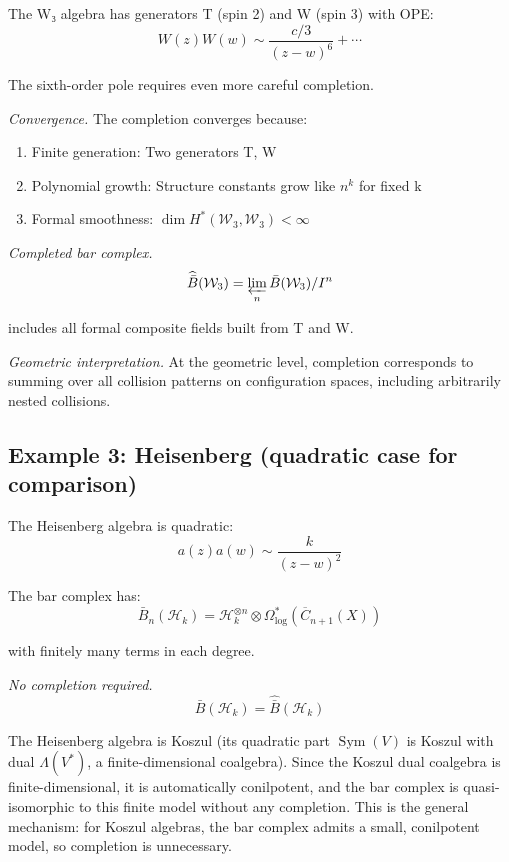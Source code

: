 \begin{example}\label{ex:w3-completion}
The W₃ algebra has generators T (spin 2) and W (spin 3) with OPE:
\[W(z)W(w) \sim \frac{c/3}{(z-w)^6} + \cdots\]

The sixth-order pole requires even more careful completion.

\emph{Convergence.}
The completion converges because:
\begin{enumerate}
\item Finite generation: Two generators T, W
\item Polynomial growth: Structure constants grow like $n^k$ for fixed k
\item Formal smoothness: $\dim H^*(\mathcal{W}_3, \mathcal{W}_3) < \infty$
\end{enumerate}

\emph{Completed bar complex.}
\[\widehat{\bar{B}}(\mathcal{W}_3) = \varprojlim_{n} \bar{B}(\mathcal{W}_3)/I^n\]

includes all formal composite fields built from T and W.

\emph{Geometric interpretation.}
At the geometric level, completion corresponds to summing over all collision patterns on configuration spaces, including arbitrarily nested collisions.
\end{example}

\subsection{Example 3: Heisenberg (quadratic case for comparison)}

\begin{example}\label{ex:heisenberg-no-completion}
The Heisenberg algebra is quadratic:
\[a(z)a(w) \sim \frac{k}{(z-w)^2}\]

The bar complex has:
\[\bar{B}_n(\mathcal{H}_k) = \mathcal{H}_k^{\otimes n} \otimes \Omega^*_{\log}(\overline{C}_{n+1}(X))\]

with finitely many terms in each degree.

\emph{No completion required.}
\[\bar{B}(\mathcal{H}_k) = \widehat{\bar{B}}(\mathcal{H}_k)\]

The Heisenberg algebra is Koszul (its quadratic part $\operatorname{Sym}(V)$ is
Koszul with dual $\Lambda(V^*)$, a finite-dimensional coalgebra).
Since the Koszul dual coalgebra is finite-dimensional, it is automatically
conilpotent, and the bar complex is quasi-isomorphic to this finite model
without any completion.  This is the general mechanism: for Koszul algebras, the
bar complex admits a small, conilpotent model, so completion is unnecessary.
\end{example}

